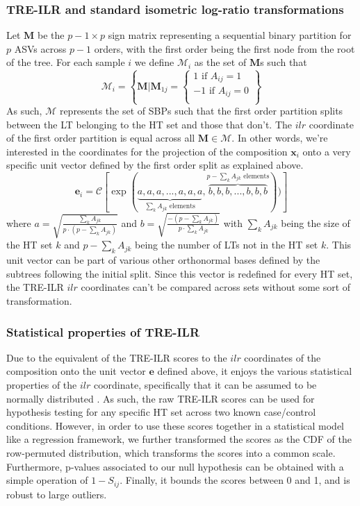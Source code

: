 \documentclass{article}
\begin{document}
\subsubsection{TRE-ILR and standard isometric log-ratio transformations}
\noindent Let $\bm M$ be the $p-1 \times p$ sign matrix representing a sequential binary partition for $p$ ASVs across $p-1$ orders, with the first order being the first node from the root of the tree. For each sample $i$ we define $\mathcal{M}_i$ as the set of $\bm M$s such that 
\[ \mathcal{M}_i = \left\{\bm{M} | \bm{M}_{1j} = \begin{cases}
    1 \text{ if } A_{ij} = 1\\
    -1 \text{ if } A_{ij} = 0\\ 
\end{cases}
\right \}
\]
As such, $\mathcal{M}$ represents the set of SBPs such that the first order partition splits between the LT belonging to the HT set and those that don't. The $ilr$ coordinate of the first order partition is equal across all $\bm{M} \in \mathcal{M}$. In other words, we're interested in the coordinates for the projection of the composition $\bm{x}_{i}$ onto a very specific unit vector defined by the first order split as explained above.  
\[\bm{e}_i = \mathcal{C}[\exp(\underbrace{a, a, a,..., a, a, a}_{\sum_k A_{jk} \text{ elements}},\overbrace{b,b,b,...,b,b,b}^{p - \sum_k A_{jk} \text{ elements}}))] \]  
where $a = \sqrt{\frac{\sum_k A_{jk}}{p \cdot (p - \sum_k A_{jk})}}$ and $b = \sqrt{\frac{-(p - \sum_k A_{jk})}{p \cdot \sum_k A_{jk}}}$ with $\sum_k A_{jk}$ being the size of the HT set $k$ and $p - \sum_k A_{jk}$ being the number of LTs not in the HT set $k$. This unit vector can be part of various other orthonormal bases defined by the subtrees following the initial split. Since this vector is redefined for every HT set, the TRE-ILR $ilr$ coordinates can't be compared across sets without some sort of transformation.  
 
\subsubsection{Statistical properties of TRE-ILR}
Due to the equivalent of the TRE-ILR scores to the $ilr$ coordinates of the composition onto the unit vector $\bm{e}$ defined above, it enjoys the various statistical properties of the $ilr$ coordinate, specifically that it can be assumed to be normally distributed \cite{egozcue2003,egozcue2005}. As such, the raw TRE-ILR scores can be used for hypothesis testing for any specific HT set across two known case/control conditions. However, in order to use these scores together in a statistical model like a regression framework, we further transformed the scores as the CDF of the row-permuted distribution, which transforms the scores into a common scale. Furthermore, p-values associated to our null hypothesis can be obtained with a simple operation of $1 - S_{ij}$. Finally, it bounds the scores between 0 and 1, and is robust to large outliers.  



\newpage
{}

\end{document}
